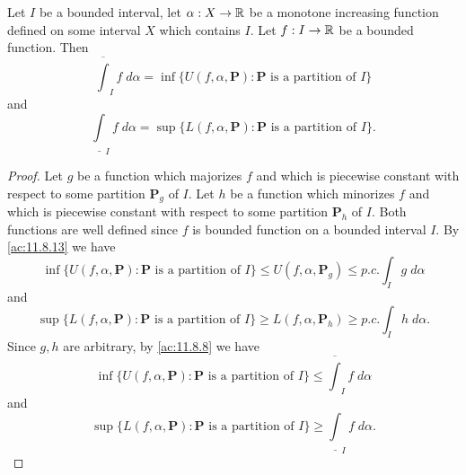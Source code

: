 \begin{ac}\label{ac:11.8.14}
  Let \(I\) be a bounded interval, let \(\alpha : X \to \mathbb{R}\) be a monotone increasing function defined on some interval \(X\) which contains \(I\).
  Let \(f : I \to \mathbb{R}\) be a bounded function.
  Then
  \[
    \overline{\int}_I f \; d \alpha = \inf\{U(f, \alpha, \mathbf{P}) : \mathbf{P} \text{ is a partition of } I\}
  \]
  and
  \[
    \underline{\int}_I f \; d \alpha = \sup\{L(f, \alpha, \mathbf{P}) : \mathbf{P} \text{ is a partition of } I\}.
  \]
\end{ac}

\begin{proof}
  Let \(g\) be a function which majorizes \(f\) and which is piecewise constant with respect to some partition \(\mathbf{P}_g\) of \(I\).
  Let \(h\) be a function which minorizes \(f\) and which is piecewise constant with respect to some partition \(\mathbf{P}_h\) of \(I\).
  Both functions are well defined since \(f\) is bounded function on a bounded interval \(I\).
  By \cref{ac:11.8.13} we have
  \[
    \inf\big\{U(f, \alpha, \mathbf{P}) : \mathbf{P} \text{ is a partition of } I\big\} \leq U(f, \alpha, \mathbf{P}_g) \leq p.c. \int_I g \; d \alpha
  \]
  and
  \[
    \sup\big\{L(f, \alpha, \mathbf{P}) : \mathbf{P} \text{ is a partition of } I\big\} \geq L(f, \alpha, \mathbf{P}_h) \geq p.c. \int_I h \; d \alpha.
  \]
  Since \(g, h\) are arbitrary, by \cref{ac:11.8.8} we have
  \[
    \inf\big\{U(f, \alpha, \mathbf{P}) : \mathbf{P} \text{ is a partition of } I\big\} \leq \overline{\int}_I f \; d \alpha
  \]
  and
  \[
    \sup\big\{L(f, \alpha, \mathbf{P}) : \mathbf{P} \text{ is a partition of } I\big\} \geq \underline{\int}_I f \; d \alpha.
  \]


\end{proof}
